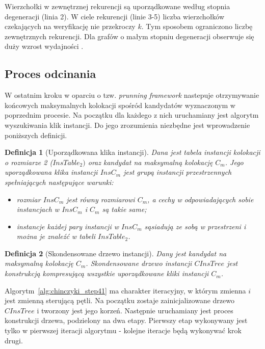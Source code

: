 \documentclass[12pt]{article}
\newtheorem{defin}{Definicja}
\newcounter{algorytm}
\begin{document}
Wierzchołki w zewnętrznej rekurencji są uporządkowane według stopnia degeneracji (linia 2). W ciele rekurencji (linie 3-5) liczba wierzchołków czekających na weryfikację nie przekroczy $ k $. Tym sposobem ograniczono liczbę zewnętrznych rekurencji. Dla grafów o małym stopniu degeneracji obserwuje się duży wzrost wydajności \cite{degenerat}.

\subsection{Proces odcinania}

W ostatnim kroku w oparciu o tzw. \textit{prunning framework} \cite{framework} nastepuje otrzymywanie końcowych maksymalnych kolokacji spośród kandydatów wyznaczonym w poprzednim procesie. Na początku dla każdego z nich uruchamiany jest algorytm wyszukiwania klik instancji. Do jego zrozumienia niezbędne jest wprowadzenie poniższych definicji.

\begin{defin}[Uporządkowana klika instancji]
Dana jest tabela instancji kolokacji o rozmiarze 2 ($ InsTable_{2}) $ oraz kandydat na maksymalną kolokację $ C_{m} $. Jego uporządkowana klika instancji $ InsC_{m} $ jest grupą instancji przestrzennych spełniających następujące warunki:
\begin{itemize}
\item rozmiar $ InsC_{m} $ jest równy rozmiarowi $ C_{m} $, a cechy w odpowiadających sobie instancjach w $ InsC_{m} $ i $ C_{m} $ są takie same; %
\item instancje każdej pary instancji w $ InsC_{m} $ sąsiadują ze sobą w przestrzeni i można je znaleźć w tabeli  $ InsTable_{2} $.
\end{itemize}
\end{defin}

\begin{defin}[Skondensowane drzewo instancji]Dany jest kandydat na maksymalną kolokację $ C_{m} $. Skondensowane drzewo instancji $ CInsTree$ jest konstrukcją kompresującą wszystkie uporządkowane kliki instancji $ C_{m} $.
\label{def:condensed}
\end{defin}

Algorytm~\ref{alg:chinczyki_step41} ma charakter iteracyjny, w którym zmienna $ i $ jest zmienną sterującą pętli. Na początku zostaje zainicjalizowane drzewo $ CInsTree $ i tworzony jest jego korzeń. Następnie uruchamiany jest proces konstrukcji drzewa, podzielony na dwa etapy. Pierwszy etap wykonywany jest tylko w pierwszej iteracji algorytmu - kolejne iteracje będą wykonywać krok drugi. 
\end{document}
